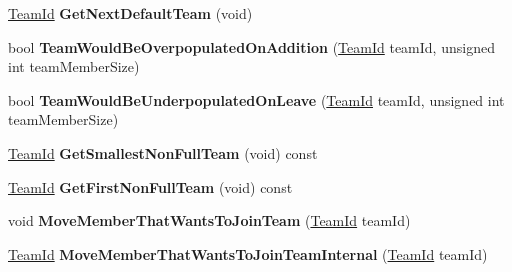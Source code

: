 \begin{DoxyCompactItemize}
\item 
\hypertarget{class_rak_net_1_1_team_balancer_a8473c3ce0fb70648a27cfb8b14a8e8ef}{\hyperlink{group___t_e_a_m___b_a_l_a_n_c_e_r___g_r_o_u_p_ga79c7825649955f28135498fb3d9f6894}{Team\-Id} {\bfseries Get\-Next\-Default\-Team} (void)}\label{class_rak_net_1_1_team_balancer_a8473c3ce0fb70648a27cfb8b14a8e8ef}

\item 
\hypertarget{class_rak_net_1_1_team_balancer_acec130a71e0fae7b7d24ebe75cd38220}{bool {\bfseries Team\-Would\-Be\-Overpopulated\-On\-Addition} (\hyperlink{group___t_e_a_m___b_a_l_a_n_c_e_r___g_r_o_u_p_ga79c7825649955f28135498fb3d9f6894}{Team\-Id} team\-Id, unsigned int team\-Member\-Size)}\label{class_rak_net_1_1_team_balancer_acec130a71e0fae7b7d24ebe75cd38220}

\item 
\hypertarget{class_rak_net_1_1_team_balancer_ae0250144d9ce8b5b99ebd7c47df80429}{bool {\bfseries Team\-Would\-Be\-Underpopulated\-On\-Leave} (\hyperlink{group___t_e_a_m___b_a_l_a_n_c_e_r___g_r_o_u_p_ga79c7825649955f28135498fb3d9f6894}{Team\-Id} team\-Id, unsigned int team\-Member\-Size)}\label{class_rak_net_1_1_team_balancer_ae0250144d9ce8b5b99ebd7c47df80429}

\item 
\hypertarget{class_rak_net_1_1_team_balancer_a3717f1fdf7cdf4688486a1e02ec26c9d}{\hyperlink{group___t_e_a_m___b_a_l_a_n_c_e_r___g_r_o_u_p_ga79c7825649955f28135498fb3d9f6894}{Team\-Id} {\bfseries Get\-Smallest\-Non\-Full\-Team} (void) const }\label{class_rak_net_1_1_team_balancer_a3717f1fdf7cdf4688486a1e02ec26c9d}

\item 
\hypertarget{class_rak_net_1_1_team_balancer_a6c75707a304fd9295418051a10d5bfde}{\hyperlink{group___t_e_a_m___b_a_l_a_n_c_e_r___g_r_o_u_p_ga79c7825649955f28135498fb3d9f6894}{Team\-Id} {\bfseries Get\-First\-Non\-Full\-Team} (void) const }\label{class_rak_net_1_1_team_balancer_a6c75707a304fd9295418051a10d5bfde}

\item 
\hypertarget{class_rak_net_1_1_team_balancer_a0b257fe1822be3d825f5571ce3251010}{void {\bfseries Move\-Member\-That\-Wants\-To\-Join\-Team} (\hyperlink{group___t_e_a_m___b_a_l_a_n_c_e_r___g_r_o_u_p_ga79c7825649955f28135498fb3d9f6894}{Team\-Id} team\-Id)}\label{class_rak_net_1_1_team_balancer_a0b257fe1822be3d825f5571ce3251010}

\item 
\hypertarget{class_rak_net_1_1_team_balancer_a59c7564ec3876c5cee1a77c15adb738c}{\hyperlink{group___t_e_a_m___b_a_l_a_n_c_e_r___g_r_o_u_p_ga79c7825649955f28135498fb3d9f6894}{Team\-Id} {\bfseries Move\-Member\-That\-Wants\-To\-Join\-Team\-Internal} (\hyperlink{group___t_e_a_m___b_a_l_a_n_c_e_r___g_r_o_u_p_ga79c7825649955f28135498fb3d9f6894}{Team\-Id} team\-Id)}\label{class_rak_net_1_1_team_balancer_a59c7564ec3876c5cee1a77c15adb738c}


\end{DoxyCompactItemize}
